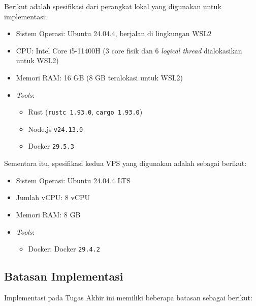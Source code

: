 Berikut adalah spesifikasi dari perangkat lokal yang digunakan untuk implementasi:
\begin{itemize}
	\item Sistem Operasi: Ubuntu 24.04.4, berjalan di lingkungan WSL2
	\item CPU: Intel Core i5-11400H (3 core fisik dan 6 \textit{logical thread} dialokasikan untuk WSL2)
	\item Memori RAM: 16 GB (8 GB teralokasi untuk WSL2)
	\item \textit{Tools}:
	      \begin{itemize}
		      \item Rust (\texttt{rustc 1.93.0}, \texttt{cargo 1.93.0})
		      \item Node.js \texttt{v24.13.0}
		      \item Docker \texttt{29.5.3}
	      \end{itemize}
\end{itemize}

Sementara itu, spesifikasi kedua VPS yang digunakan adalah sebagai berikut:
\begin{itemize}
	\item Sistem Operasi: Ubuntu 24.04.4 LTS
	\item Jumlah vCPU: 8 vCPU
	\item Memori RAM: 8 GB
	\item \textit{Tools}:
	      \begin{itemize}
		      \item Docker: Docker \texttt{29.4.2}
	      \end{itemize}
\end{itemize}

\subsection{Batasan Implementasi}
\label{subsec:batasan-implementasi}

Implementasi pada Tugas Akhir ini memiliki beberapa batasan sebagai berikut:

